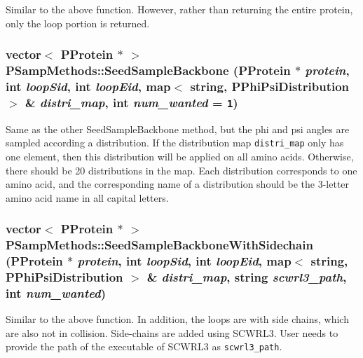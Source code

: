 Similar to the above function. However, rather than returning the entire protein, only the loop portion is returned. 
\subsubsection{\setlength{\rightskip}{0pt plus 5cm}vector$<$ {\bf PProtein} $\ast$ $>$ PSamp\-Methods::Seed\-Sample\-Backbone ({\bf PProtein} $\ast$ {\em protein}, int {\em loop\-Sid}, int {\em loop\-Eid}, map$<$ string, {\bf PPhi\-Psi\-Distribution} $>$ \& {\em distri\_\-map}, int {\em num\_\-wanted} = {\tt 1})\hspace{0.3cm}{\tt  [static]}}\label{classPSampMethods_2c309a5c30ed00a2796e918fab4379e2}


Same as the other Seed\-Sample\-Backbone method, but the phi and psi angles are sampled according a distribution. If the distribution map {\tt distri\_\-map} only has one element, then this distribution will be applied on all amino acids. Otherwise, there should be 20 distributions in the map. Each distribution corresponds to one amino acid, and the corresponding name of a distribution should be the 3-letter amino acid name in all capital letters. 
\subsubsection{\setlength{\rightskip}{0pt plus 5cm}vector$<$ {\bf PProtein} $\ast$ $>$ PSamp\-Methods::Seed\-Sample\-Backbone\-With\-Sidechain ({\bf PProtein} $\ast$ {\em protein}, int {\em loop\-Sid}, int {\em loop\-Eid}, map$<$ string, {\bf PPhi\-Psi\-Distribution} $>$ \& {\em distri\_\-map}, string {\em scwrl3\_\-path}, int {\em num\_\-wanted})\hspace{0.3cm}{\tt  [static]}}\label{classPSampMethods_a6ff6d0d4c7a9345e44bd9a6eed8efae}


Similar to the above function. In addition, the loops are with side chains, which are also not in collision. Side-chains are added using SCWRL3. User needs to provide the path of the executable of SCWRL3 as {\tt scwrl3\_\-path}. 
